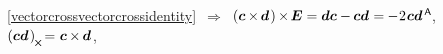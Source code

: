 {\vspace{-0.8em}\noindent
{}

\nopagebreak
{\centering \eqref{vectorcrossvectorcrossidentity}~$\Rightarrow$~${\left( \bm{c} \hspace{-0.1ex} \times \hspace{-0.2ex} \bm{d} \hspace{.2ex} \right) \hspace{-0.12ex} \times \hspace{-0.25ex} \bm{E} = \bm{d} \bm{c} - \hspace{-0.1ex} \bm{c} \bm{d} \hspace{.1ex} = \hspace{-0.1ex} - \hspace{.1ex} 2 \hspace{.15ex} \bm{c}\bm{d}^{\mathsf{\hspace{.3ex}A}}\hspace{-0.2ex}}$,\hspace{.32em}
${\left( \bm{c} \bm{d} \hspace{.2ex} \right)_{\hspace{-0.15ex}\Xcompanion} \hspace{-0.32ex} =
\hspace{.1ex} \bm{c} \hspace{-0.1ex} \times \hspace{-0.15ex} \bm{d} \hspace{.12ex}}$, \par}

\nopagebreak\vspace{-0.1em}\noindent
{}

}
